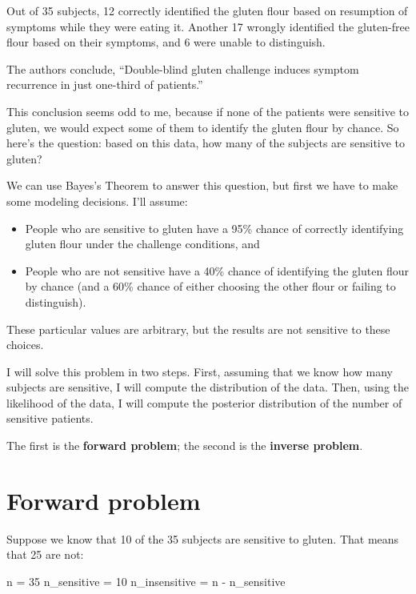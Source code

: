 \documentclass[12pt]{book}
\theoremstyle{exercise}
\begin{document}
Out of 35 subjects, 12 correctly identified the gluten flour based on resumption of symptoms while they were eating it.  Another 17 wrongly identified the gluten-free flour based on their symptoms, and 6 were unable to distinguish.  

The authors conclude, ``Double-blind gluten challenge induces symptom recurrence in just one-third of patients.''

This conclusion seems odd to me, because if none of the patients were sensitive to gluten, we would expect some of them to identify the gluten flour by chance.
So here's the question: based on this data, how many of the subjects are sensitive to gluten?

We can use Bayes's Theorem to answer this question, but first we have to make some modeling decisions.
I'll assume:

\begin{itemize}

\item People who are sensitive to gluten have a 95\% chance of correctly identifying gluten flour under the challenge conditions, and 

\item People who are not sensitive have a 40\% chance of identifying the gluten flour by chance (and a 60\% chance of either choosing the other flour or failing to distinguish).

\end{itemize}

These particular values are arbitrary, but the results are not sensitive to these choices.

I will solve this problem in two steps.  First, assuming that we know how many subjects are sensitive, I will compute the distribution of the data.  Then, using the likelihood of the data, I will compute the posterior distribution of the number of sensitive patients.

The first is the {\bf forward problem}; the second is the {\bf inverse problem}.


\section{Forward problem}

Suppose we know that 10 of the 35 subjects are sensitive to gluten.  That means that 25 are not:

\begin{code}
n = 35
n_sensitive = 10
n_insensitive = n - n_sensitive
\end{code}
\end{document}
